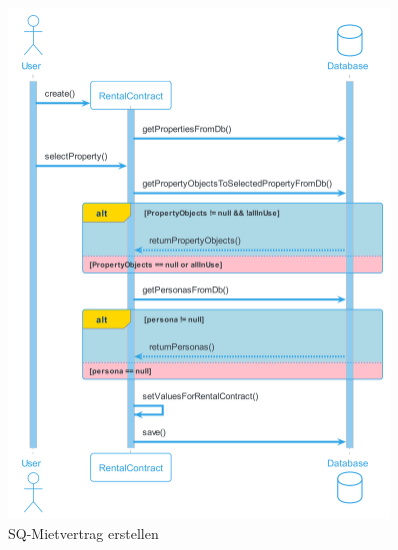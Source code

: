 \begin{figure}[H]
  \begin{center}
    \includegraphics[width=0.9\textwidth]{content/diagrams/out/sequenzdiagram/mietvertrag/mietvertrag.png}
    \caption{SQ-Mietvertrag erstellen}

  \end{center}
\end{figure}

